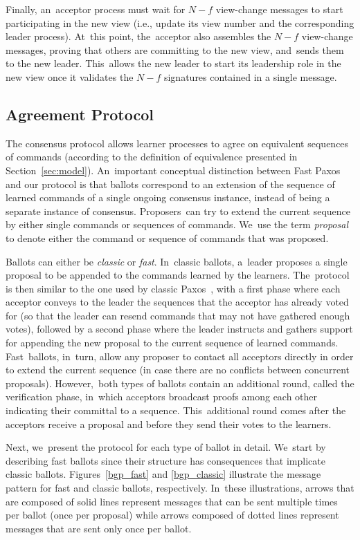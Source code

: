 \documentclass[algorithms,article,accept,moreauthors,pdftex,10pt,a4paper]{Definitions/mdpi}
\begin{document}
Finally, an~acceptor process must wait for $N-f$ view-change messages to start participating in the new view (i.e., update its view number and the corresponding leader process). At~this point, the~acceptor also assembles the $N-f$ view-change messages, proving that others are committing to the new view, and~sends them to the new leader. This~allows the new leader to start its leadership role in the new view once it validates the $N-f$ signatures contained in a single message.

\subsection{Agreement Protocol} 

The consensus protocol allows learner processes to agree on equivalent sequences of commands (according to the definition of equivalence presented in Section~\ref{sec:model}). An~important conceptual distinction between Fast Paxos~\cite{L06} and our protocol is that ballots correspond to an extension of the sequence of learned commands of a single ongoing consensus instance, instead of being a separate instance of consensus. Proposers~can try to extend the current sequence by either single commands or sequences of commands. We~use the term \textit{proposal} to denote either the command or sequence of commands that was proposed.\par
Ballots can either be \textit{classic} or \textit{fast}. In~classic ballots, a~leader proposes a single proposal to be appended to the commands learned by the learners. The~protocol is then similar to the one used by classic Paxos~\cite{Lam98}, with a first phase where each acceptor conveys to the leader the sequences that the acceptor has already voted for (so that the leader can resend commands that may not have gathered enough votes), followed by a second phase where the leader instructs and gathers support for appending the new proposal to the current sequence of learned commands. Fast~ballots, in~turn, allow any proposer to contact all acceptors directly in order to extend the current sequence (in case there are no conflicts between concurrent proposals). However,~both types of ballots contain an additional round, called the verification phase, in~which acceptors broadcast proofs among each other indicating their committal to a sequence. This~additional round comes after the acceptors receive a proposal and before they send their votes to the learners.\par
Next, we~present the protocol for each type of ballot in detail. We~start by describing fast ballots since their structure has consequences that implicate classic ballots. Figures~\ref{bgp_fast} and \ref{bgp_classic} illustrate the message pattern for fast and classic ballots, respectively. In~these illustrations, arrows that are composed of solid lines represent messages that can be sent multiple times per ballot (once per proposal) while arrows composed of dotted lines represent messages that are sent only once per ballot.
\end{document}
